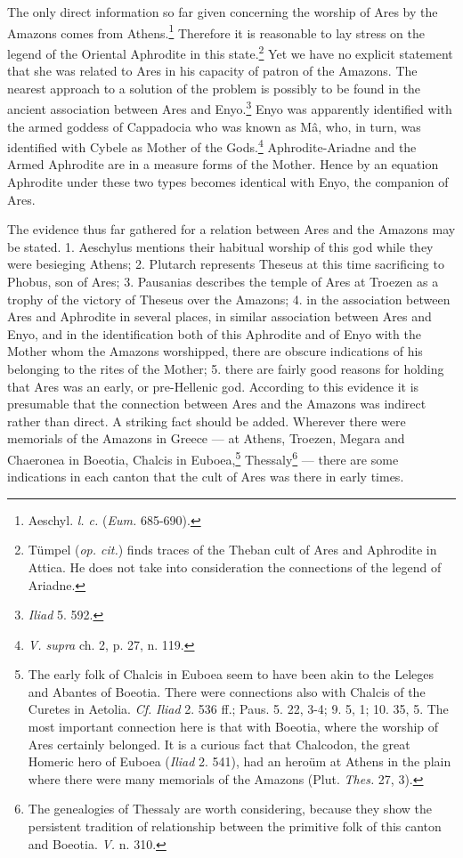 \documentclass[a4paper, 12pt, oneside]{article}
\begin{document}
The only direct information so far given concerning the worship of Ares by the Amazons comes from Athens.\footnote{Aeschyl. \emph{l. c.} (\emph{Eum.} 685-690).} Therefore it is reasonable to lay stress on the legend of the Oriental Aphrodite in this state.\footnote{Tümpel (\emph{op. cit.}) finds traces of the Theban cult of Ares and Aphrodite in Attica. He does not take into consideration the connections of the legend of Ariadne.} Yet we have no explicit statement that she was related to Ares in his capacity of patron of the Amazons. The nearest approach to a solution of the problem is possibly to be found in the ancient association between Ares and Enyo.\footnote{\emph{Iliad} 5. 592.} Enyo was apparently identified with the armed goddess of Cappadocia who was known as Mâ, who, in turn, was identified with Cybele as Mother of the Gods.\footnote{\emph{V. supra} ch. 2, p. 27, n. 119.} Aphrodite-Ariadne and the Armed Aphrodite are in a measure forms of the Mother. Hence by an equation Aphrodite under these two types becomes identical with Enyo, the companion of Ares.

The evidence thus far gathered for a relation between Ares and the Amazons may be stated. 1. Aeschylus mentions their habitual worship of this god while they were besieging Athens; 2. Plutarch represents Theseus at this time sacrificing to Phobus, son of Ares; 3. Pausanias describes the temple of Ares at Troezen as a trophy of the victory of Theseus over the Amazons; 4. in the association between Ares and Aphrodite in several places, in similar association between Ares and Enyo, and in the identification both of this Aphrodite and of Enyo with the Mother whom the Amazons worshipped, there are obscure indications of his belonging to the rites of the Mother; 5. there are fairly good reasons for holding that Ares was an early, or pre-Hellenic god. According to this evidence it is presumable that the connection between Ares and the Amazons was indirect rather than direct. A striking fact should be added. Wherever there were memorials of the Amazons in Greece --- at Athens, Troezen, Megara and Chaeronea in Boeotia, Chalcis in Euboea,\footnote{The early folk of Chalcis in Euboea seem to have been akin to the Leleges and Abantes of Boeotia. There were connections also with Chalcis of the Curetes in Aetolia. \emph{Cf.} \emph{Iliad} 2. 536 ff.; Paus. 5. 22, 3-4; 9. 5, 1; 10. 35, 5. The most important connection here is that with Boeotia, where the worship of Ares certainly belonged. It is a curious fact that Chalcodon, the great Homeric hero of Euboea (\emph{Iliad} 2. 541), had an heroüm at Athens in the plain where there were many memorials of the Amazons (Plut. \emph{Thes.} 27, 3).} Thessaly\footnote{The genealogies of Thessaly are worth considering, because they show the persistent tradition of relationship between the primitive folk of this canton and Boeotia. \emph{V.} n. 310.} --- there are some indications in each canton that the cult of Ares was there in early times.
\end{document}

